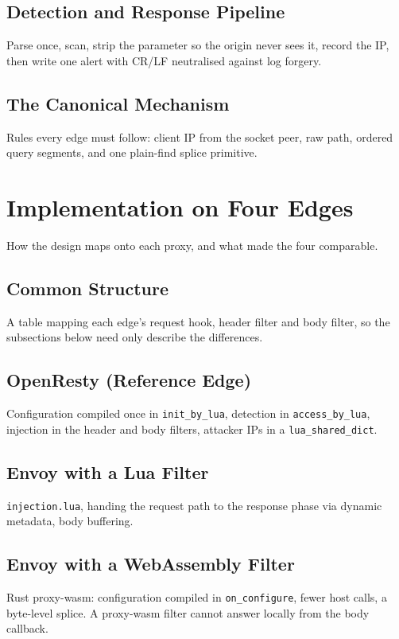 \documentclass{rptuma}
\begin{document}
\section{Detection and Response Pipeline}
Parse once, scan, strip the parameter so the origin never sees it, record the IP, then write one
alert with CR/LF neutralised against log forgery.

\section{The Canonical Mechanism}
\label{sec:AB.canonical}
Rules every edge must follow: client IP from the socket peer, raw path, ordered query segments,
and one plain-find splice primitive.

\chapter{Implementation on Four Edges}
How the design maps onto each proxy, and what made the four comparable.

\section{Common Structure}
A table mapping each edge's request hook, header filter and body filter, so the subsections below
need only describe the differences.

\section{OpenResty (Reference Edge)}
Configuration compiled once in \texttt{init\_by\_lua}, detection in \texttt{access\_by\_lua},
injection in the header and body filters, attacker IPs in a \texttt{lua\_shared\_dict}.

\section{Envoy with a Lua Filter}
\texttt{injection.lua}, handing the request path to the response phase via dynamic metadata, body
buffering.

\section{Envoy with a WebAssembly Filter}
Rust proxy-wasm: configuration compiled in \texttt{on\_configure}, fewer host calls, a byte-level
splice. A proxy-wasm filter cannot answer locally from the body callback.
\end{document}
